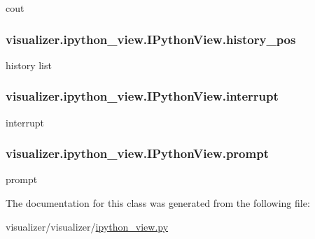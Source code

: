 cout 

\subsubsection[{\texorpdfstring{history\+\_\+pos}{history_pos}}]{\setlength{\rightskip}{0pt plus 5cm}visualizer.\+ipython\+\_\+view.\+I\+Python\+View.\+history\+\_\+pos}\hypertarget{classvisualizer_1_1ipython__view_1_1IPythonView_a7862c74bd0d2e5f58ade1f6410ddca1d}{}\label{classvisualizer_1_1ipython__view_1_1IPythonView_a7862c74bd0d2e5f58ade1f6410ddca1d}


history list 

\subsubsection[{\texorpdfstring{interrupt}{interrupt}}]{\setlength{\rightskip}{0pt plus 5cm}visualizer.\+ipython\+\_\+view.\+I\+Python\+View.\+interrupt}\hypertarget{classvisualizer_1_1ipython__view_1_1IPythonView_ad3937b08cb14ec5390c2e0101952765e}{}\label{classvisualizer_1_1ipython__view_1_1IPythonView_ad3937b08cb14ec5390c2e0101952765e}


interrupt 

\subsubsection[{\texorpdfstring{prompt}{prompt}}]{\setlength{\rightskip}{0pt plus 5cm}visualizer.\+ipython\+\_\+view.\+I\+Python\+View.\+prompt}\hypertarget{classvisualizer_1_1ipython__view_1_1IPythonView_ac70be49befad3abf7fbb1fa8d460e439}{}\label{classvisualizer_1_1ipython__view_1_1IPythonView_ac70be49befad3abf7fbb1fa8d460e439}


prompt 



The documentation for this class was generated from the following file\+:\begin{DoxyCompactItemize}
\item 
visualizer/visualizer/\hyperlink{ipython__view_8py}{ipython\+\_\+view.\+py}\end{DoxyCompactItemize}
